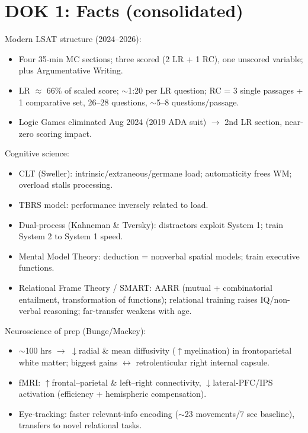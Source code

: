 \documentclass[11pt]{article}
\begin{document}
\section*{DOK 1: Facts (consolidated)}

Modern LSAT structure (2024--2026):
\begin{itemize}
\item Four 35-min MC sections; three scored (2 LR + 1 RC), one unscored variable; plus Argumentative Writing.
\item LR $\approx$ 66\% of scaled score; $\sim$1:20 per LR question; RC = 3 single passages + 1 comparative set, 26--28 questions, $\sim$5--8 questions/passage.
\item Logic Games eliminated Aug 2024 (2019 ADA suit) $\rightarrow$ 2nd LR section, near-zero scoring impact.
\end{itemize}

Cognitive science:
\begin{itemize}
\item CLT (Sweller): intrinsic/extraneous/germane load; automaticity frees WM; overload stalls processing.
\item TBRS model: performance inversely related to load.
\item Dual-process (Kahneman \& Tversky): distractors exploit System 1; train System 2 to System 1 speed.
\item Mental Model Theory: deduction = nonverbal spatial models; train executive functions.
\item Relational Frame Theory / SMART: AARR (mutual + combinatorial entailment, transformation of functions); relational training raises IQ/non-verbal reasoning; far-transfer weakens with age.
\end{itemize}

Neuroscience of prep (Bunge/Mackey):
\begin{itemize}
\item $\sim$100 hrs $\rightarrow$ $\downarrow$radial \& mean diffusivity ($\uparrow$myelination) in frontoparietal white matter; biggest gains $\leftrightarrow$ retrolenticular right internal capsule.
\item fMRI: $\uparrow$frontal--parietal \& left--right connectivity, $\downarrow$lateral-PFC/IPS activation (efficiency + hemispheric compensation).
\item Eye-tracking: faster relevant-info encoding ($\sim$23 movements/7 sec baseline), transfers to novel relational tasks.
\end{itemize}
\end{document}
